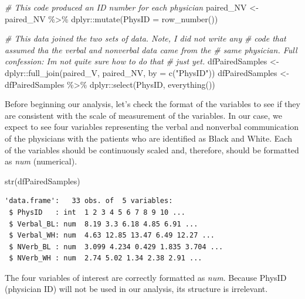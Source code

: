 \documentclass[
  11pt,
]{book}
\newenvironment{Shaded}{\begin{snugshade}}{\end{snugshade}}
\newcommand{\AttributeTok}[1]{\textcolor[rgb]{0.77,0.63,0.00}{#1}}
\newcommand{\CommentTok}[1]{\textcolor[rgb]{0.56,0.35,0.01}{\textit{#1}}}
\newcommand{\FunctionTok}[1]{\textcolor[rgb]{0.00,0.00,0.00}{#1}}
\newcommand{\NormalTok}[1]{#1}
\newcommand{\OtherTok}[1]{\textcolor[rgb]{0.56,0.35,0.01}{#1}}
\newcommand{\SpecialCharTok}[1]{\textcolor[rgb]{0.00,0.00,0.00}{#1}}
\newcommand{\StringTok}[1]{\textcolor[rgb]{0.31,0.60,0.02}{#1}}
\begin{document}
\begin{Shaded}
\begin{Highlighting}[]
\CommentTok{\# This code produced an ID number for each physician}
\NormalTok{paired\_NV }\OtherTok{\textless{}{-}}\NormalTok{ paired\_NV }\SpecialCharTok{\%\textgreater{}\%}
\NormalTok{    dplyr}\SpecialCharTok{::}\FunctionTok{mutate}\NormalTok{(}\AttributeTok{PhysID =} \FunctionTok{row\_number}\NormalTok{())}

\CommentTok{\# This data joined the two sets of data.  Note, I did not write any}
\CommentTok{\# code that assumed tha the verbal and nonverbal data came from the}
\CommentTok{\# same physician.  Full confession: I\textquotesingle{}m not quite sure how to do that}
\CommentTok{\# just yet.}
\NormalTok{dfPairedSamples }\OtherTok{\textless{}{-}}\NormalTok{ dplyr}\SpecialCharTok{::}\FunctionTok{full\_join}\NormalTok{(paired\_V, paired\_NV, }\AttributeTok{by =} \FunctionTok{c}\NormalTok{(}\StringTok{"PhysID"}\NormalTok{))}
\NormalTok{dfPairedSamples }\OtherTok{\textless{}{-}}\NormalTok{ dfPairedSamples }\SpecialCharTok{\%\textgreater{}\%}
\NormalTok{    dplyr}\SpecialCharTok{::}\FunctionTok{select}\NormalTok{(PhysID, }\FunctionTok{everything}\NormalTok{())}
\end{Highlighting}
\end{Shaded}

Before beginning our analysis, let's check the format of the variables to see if they are consistent with the scale of measurement of the variables. In our case, we expect to see four variables representing the verbal and nonverbal communication of the physicians with the patients who are identified as Black and White. Each of the variables should be continuously scaled and, therefore, should be formatted as \emph{num} (numerical).

\begin{Shaded}
\begin{Highlighting}[]
\FunctionTok{str}\NormalTok{(dfPairedSamples)}
\end{Highlighting}
\end{Shaded}

\begin{verbatim}
'data.frame':   33 obs. of  5 variables:
 $ PhysID   : int  1 2 3 4 5 6 7 8 9 10 ...
 $ Verbal_BL: num  8.19 3.3 6.18 4.85 6.91 ...
 $ Verbal_WH: num  4.63 12.85 13.47 6.49 12.27 ...
 $ NVerb_BL : num  3.099 4.234 0.429 1.835 3.704 ...
 $ NVerb_WH : num  2.74 5.02 1.34 2.38 2.91 ...
\end{verbatim}

The four variables of interest are correctly formatted as \emph{num}. Because PhysID (physician ID) will not be used in our analysis, its structure is irrelevant.
\end{document}
